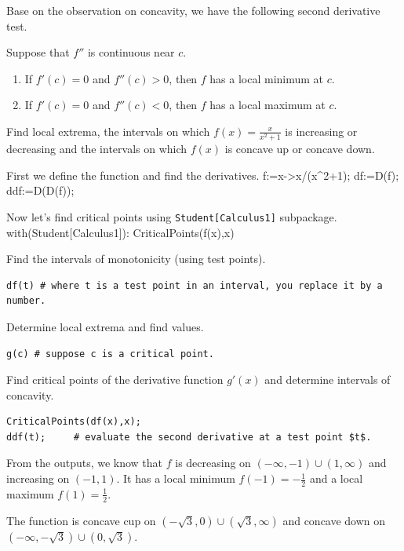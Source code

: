 \documentclass[
  en,11pt,simple]{elegantbook}
\renewenvironment{example}[1][]{
  \refstepcounter{exam}
  \par\noindent\textbf{\color{main}{\examplename} \theexam #1}
  \rmfamily
}{
  \par\ignorespacesafterend
}
\begin{document}
Base on the observation on concavity, we have the following second derivative test.

\begin{theorem}
Suppose that \(f''\) is continuous near \(c\).

\begin{enumerate}
\def\labelenumi{\arabic{enumi}.}

\item
  If \(f'(c)=0\) and \(f''(c)>0\), then \(f\) has a local minimum at \(c\).
\item
  If \(f'(c)=0\) and \(f''(c)<0\), then \(f\) has a local maximum at \(c\).
\end{enumerate}
\end{theorem}

\begin{example}

Find local extrema, the intervals on which \(f(x)=\frac{x}{x^2+1}\) is increasing or decreasing and the intervals on which \(f(x)\) is concave up or concave down.
\end{example}

\begin{solution}
{}
First we define the function and find the derivatives.
f:=x-\textgreater x/(x\^{}2+1);
df:=D(f);
ddf:=D(D(f));

Now let's find critical points using \texttt{Student{[}Calculus1{]}} subpackage.
with(Student{[}Calculus1{]}):
CriticalPoints(f(x),x)

Find the intervals of monotonicity (using test points).

\begin{verbatim}
df(t) # where t is a test point in an interval, you replace it by a number.
\end{verbatim}

Determine local extrema and find values.

\begin{verbatim}
g(c) # suppose c is a critical point.
\end{verbatim}

Find critical points of the derivative function \(g'(x)\) and determine intervals of concavity.

\begin{verbatim}
CriticalPoints(df(x),x);
ddf(t);     # evaluate the second derivative at a test point $t$.
\end{verbatim}

From the outputs, we know that \(f\) is decreasing on \((-\infty, -1)\cup (1, \infty)\) and increasing on \((-1, 1)\). It has a local minimum \(f(-1)=-\frac12\) and a local maximum \(f(1)=\frac12\).

The function is concave cup on \((-\sqrt{3}, 0)\cup (\sqrt{3},\infty)\) and concave down on \((-\infty,-\sqrt{3})\cup (0,\sqrt{3})\).
\end{solution}
\end{document}
